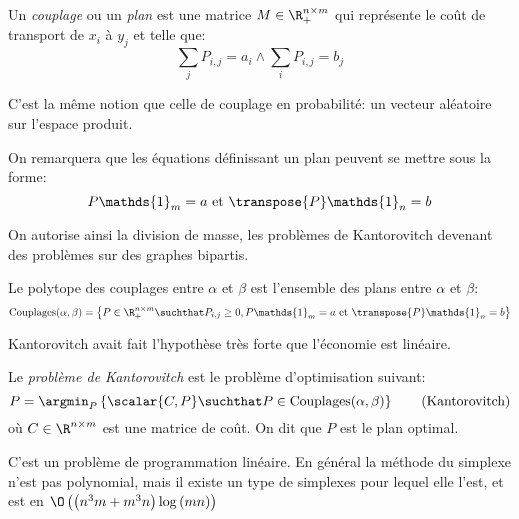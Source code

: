 \documentclass[info, math, french]{mpb-cours}
\begin{document}
\begin{definition}
	Un \emph{couplage} ou un \emph{plan} est une matrice $M \in \R_{+}^{n \times m}$ qui représente le coût de transport de $x_{i}$ à $y_{j}$ et telle que:
	\begin{equation*}
		\sum_{j} P_{i, j} = a_{i} \land \sum_{i}P_{i, j} = b_{j}
	\end{equation*}
\end{definition}
\begin{remarque}
	C'est la même notion que celle de couplage en probabilité: un vecteur aléatoire sur l'espace produit.
\end{remarque}

On remarquera que les équations définissant un plan peuvent se mettre sous la forme:
\begin{equation*}
	P\mathds{1}_{m} = a \text{ et } \transpose{P}\mathds{1}_{n} = b
\end{equation*}

On autorise ainsi la division de masse, les problèmes de Kantorovitch devenant des problèmes sur des graphes bipartis.

\begin{definition}
	Le polytope des couplages entre $\alpha$ et $\beta$ est l'ensemble des plans entre $\alpha$ et $\beta$:
	\begin{equation*}
		\mathrm{Couplages}(\alpha, \beta) = \left\{P \in \R_{+}^{n \times m} \suchthat P_{i, j} \geq 0, P\mathds{1}_{m} = a \text{ et } \transpose{P}\mathds{1}_{n} = b\right\}
	\end{equation*}
\end{definition}

Kantorovitch avait fait l'hypothèse très forte que l'économie est linéaire.

\begin{definition}
	Le \emph{problème de Kantorovitch} est le problème d'optimisation suivant:
	\begin{equation}
		P = \argmin_{P} \left\{\scalar{C, P} \suchthat P \in \mathrm{Couplages}(\alpha, \beta)\right\} \tag{Kantorovitch}\label{eq:K}
	\end{equation}
	où $C \in \R^{n \times m}$ est une matrice de coût. On dit que $P$ est le plan optimal.
\end{definition}

C'est un problème de programmation linéaire.
En général la méthode du simplexe n'est pas polynomial, mais il existe un type de simplexes pour lequel elle l'est, et est en $\O\left(\left(n^{3}m + m^{3}n\right)\log\left(mn\right)\right)$
\end{document}
